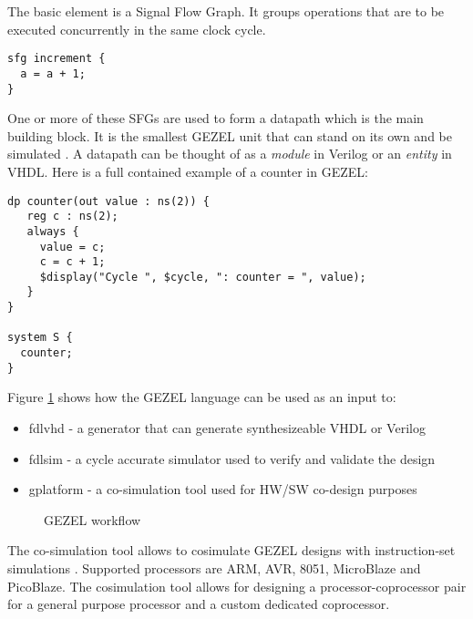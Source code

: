 The basic element is a Signal Flow Graph. It groups operations that
are to be executed concurrently in the same clock cycle.
\begin{lstlisting}[language=GEZEL]
sfg increment {
  a = a + 1;
}
\end{lstlisting}
One or more of these SFGs are used to form a datapath which is the
main building block. It is the smallest GEZEL unit that can stand on
its own and be simulated \cite{gezel}. A datapath can be thought of as
a \emph{module} in Verilog or an \emph{entity} in VHDL. Here is a
full contained example of a counter in GEZEL:
\begin{lstlisting}[language=GEZEL]
dp counter(out value : ns(2)) {
   reg c : ns(2);
   always {
     value = c;
     c = c + 1;
     $display("Cycle ", $cycle, ": counter = ", value);
   }
}
 
system S {
  counter;
}
\end{lstlisting}

\filbreak
Figure \ref{fig:gezel_workflow} shows how the GEZEL language
can be used as an input to:
\begin{itemize}
\item fdlvhd - a generator that can generate synthesizeable VHDL or
  Verilog
\item fdlsim - a cycle accurate simulator used to verify and validate
  the design
\item gplatform - a co-simulation tool used for HW/SW co-design purposes
\end{itemize}

\begin{figure}[hbt!]
  \centering
  \caption{GEZEL workflow \cite{gezel}}
  \label{fig:gezel_workflow}
\end{figure}

The co-simulation tool allows to cosimulate GEZEL designs with
instruction-set simulations \cite{gezel}. Supported processors are
ARM, AVR, 8051, MicroBlaze and PicoBlaze. The cosimulation tool allows
for designing a processor-coprocessor pair for a general purpose
processor and a custom dedicated coprocessor.

